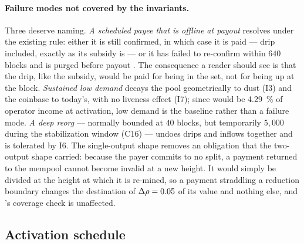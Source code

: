 \begin{remark}
\end{remark}

\paragraph{Failure modes not covered by the invariants.}
Three deserve naming. \emph{A scheduled payee that is offline at payout} resolves under the existing
rule: either it is still confirmed, in which case it is paid --- drip included, exactly as its
subsidy is --- or it has failed to re-confirm within $640$ blocks and is purged before payout
\shipped {}. The consequence a reader should see is
that the drip, like the subsidy, would be paid for being in the set, not for being up at the block.
\emph{Sustained low demand} decays the pool geometrically to dust (I3) and the coinbase to today's,
with no liveness effect (I7); since \PNR would be \SI{4.29}{\percent} of operator income at
activation, low demand is the baseline rather than a failure mode. \emph{A deep reorg} --- normally
bounded at $40$ blocks, but temporarily $5{,}000$ during the \PoN stabilization window
 (C16) --- undoes drips and inflows together and is tolerated
by I6. The single-output shape removes an obligation that the two-output shape carried: because the
payer commits to no split, a payment returned to the mempool cannot become invalid at a new height.
It would simply be divided at the height at which it is re-mined, so a payment straddling a
reduction boundary changes the destination of $\Delta\rho = 0.05$ of its value and nothing else,
and \FluxOS's coverage check is unaffected.

\subsection{Activation schedule}
\label{sec:pnr:activation}

